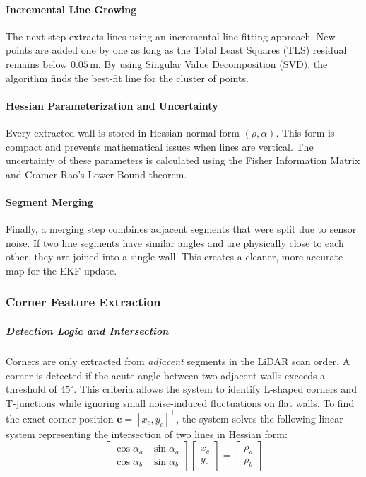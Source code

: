 \documentclass[11pt]{article}
\begin{document}
\paragraph{Incremental Line Growing}
The next step extracts lines using an incremental line fitting approach. New points are added one by one as long as the Total Least Squares (TLS) residual remains below $0.05\,\text{m}$. By using Singular Value Decomposition (SVD), the algorithm finds the best-fit line for the cluster of points. 

\paragraph{Hessian Parameterization and Uncertainty}
Every extracted wall is stored in Hessian normal form $(\rho, \alpha)$. This form is compact and prevents mathematical issues when lines are vertical. The uncertainty of these parameters is calculated using the Fisher Information Matrix and Cramer Rao's Lower Bound theorem. 

\paragraph{Segment Merging}
Finally, a merging step combines adjacent segments that were split due to sensor noise. If two line segments have similar angles and are physically close to each other, they are joined into a single wall. This creates a cleaner, more accurate map for the EKF update.

\subsubsection{Corner Feature Extraction}

\subparagraph{Detection Logic and Intersection}
Corners are only extracted from \textit{adjacent} segments in the LiDAR scan order. A corner is detected if the acute angle between two adjacent walls exceeds a threshold of $45^\circ$. This criteria allows the system to identify L-shaped corners and T-junctions while ignoring small noise-induced fluctuations on flat walls. To find the exact corner position $\mathbf{c} = [x_c, y_c]^\top$, the system solves the following linear system representing the intersection of two lines in Hessian form:
\begin{equation}
	\begin{bmatrix} \cos\alpha_a & \sin\alpha_a \\ \cos\alpha_b & \sin\alpha_b \end{bmatrix} \begin{bmatrix} x_c \\ y_c \end{bmatrix} = \begin{bmatrix} \rho_a \\ \rho_b \end{bmatrix}
\end{equation}
\end{document}
